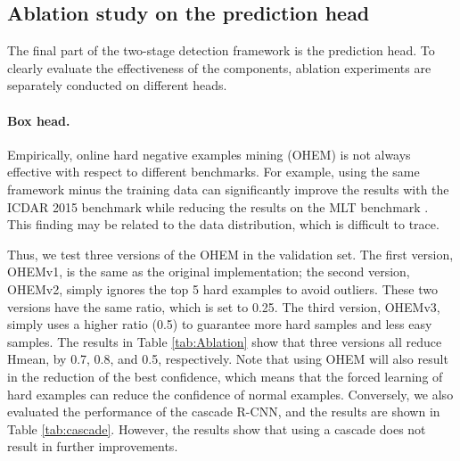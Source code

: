 \begin{table}
  \caption{Ablation results of using cascade r-cnn. cf: best threshold. R: recall. P: precision. H: Hmean.}
  \label{tab:cascade}       
\end{table}

\subsection{Ablation study on the prediction head}
The final part of the two-stage detection framework is the prediction head. To clearly evaluate the effectiveness of the components, ablation experiments are separately conducted on different heads.

\paragraph{Box head.} 
Empirically, online hard negative examples mining (OHEM) \cite{shrivastava2016training} is not always effective with respect to different benchmarks. For example, using the same framework minus the training data can significantly improve the results with the ICDAR 2015 benchmark \cite{karatzas2015icdar} while reducing the results on the MLT benchmark \cite{nayef2017icdar2017}. This finding may be related to the data distribution, which is difficult to trace. 

Thus, we test three versions of the OHEM in the validation set. The first version, OHEMv1, is the same as the original implementation; the second version, OHEMv2, simply ignores the top 5 hard examples to avoid outliers.
These two versions have the same ratio, which is set to 0.25. The third version, OHEMv3, simply uses a higher ratio (0.5) to guarantee more hard samples and less easy samples. The results in Table \ref{tab:Ablation} show that three versions all reduce Hmean, by 0.7, 0.8, and 0.5, respectively. Note that using OHEM will also result in the reduction of the best confidence, which means that the forced learning of hard examples can reduce the confidence of normal examples. Conversely, we also evaluated the performance of the cascade R-CNN, and the results are shown in Table \ref{tab:cascade}. However, the results show that using a cascade does not result in further improvements.

